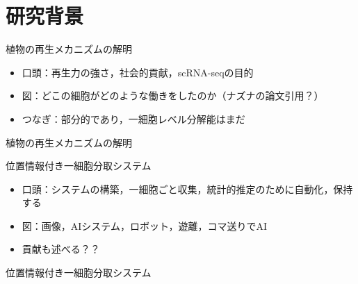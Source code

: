 \section{研究背景}

\begin{frame}[noframenumbering]{植物の再生メカニズムの解明}
    \begin{itemize}
        \item 口頭：再生力の強さ，社会的貢献，scRNA-seqの目的
        \item 図：どこの細胞がどのような働きをしたのか（ナズナの論文引用？）
        \item つなぎ：部分的であり，一細胞レベル分解能はまだ
    \end{itemize}
\end{frame}
\begin{frame}{植物の再生メカニズムの解明}
\end{frame}

\begin{frame}[noframenumbering]{位置情報付き一細胞分取システム}
    \begin{itemize}
        \item 口頭：システムの構築，一細胞ごと収集，統計的推定のために自動化，保持する
        \item 図：画像，AIシステム，ロボット，遊離，コマ送りでAI
        \item 貢献も述べる？？
    \end{itemize}
\end{frame}
\begin{frame}{位置情報付き一細胞分取システム}
\end{frame}